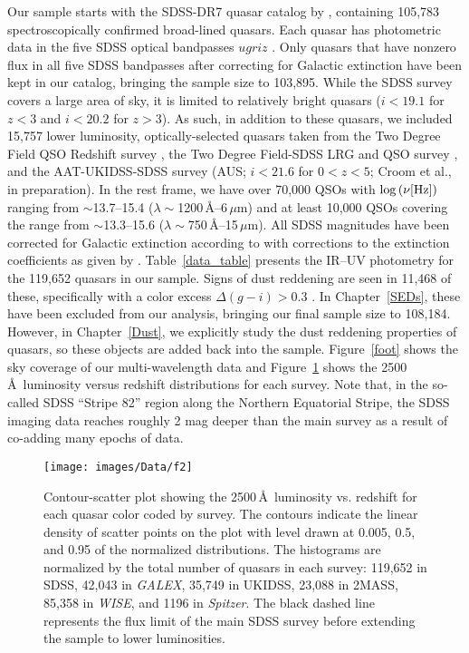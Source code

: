 Our sample starts with the SDSS-DR7 quasar catalog by \citet{Schneider:2010}, containing 105,783 spectroscopically confirmed broad-lined quasars.  Each quasar has photometric data in the five SDSS optical bandpasses $ugriz$ \citep{Fukugita:1996}.  
Only quasars that have nonzero flux in all five SDSS bandpasses after correcting for Galactic extinction have been kept in our catalog, bringing the sample size to 103,895.
While the SDSS survey covers a large area of sky, it is limited to relatively bright quasars ($i<19.1$ for $z<3$ and $i<20.2$ for $z>3$).  As such, in addition to these quasars, we included 15,757 lower luminosity, optically-selected quasars taken from the Two Degree Field QSO Redshift survey \citep[2QZ; $b_J<20.85$ for $z<3$;][]{Croom:2004}, the Two Degree Field-SDSS LRG and QSO survey \citep[2SLAQ; $g<21.85$ for $z<3$;][]{Croom:2009}, and the AAT-UKIDSS-SDSS survey (AUS; $i<21.6$ for $0<z<5$; Croom et al., in preparation). 
In the rest frame, we have over 70,000 QSOs with $\log{(\nu [{\rm Hz}])}$ ranging from $\sim$13.7--15.4 ($\lambda\sim$1200\,\AA--6\,$\mu$m) and at least 10,000 QSOs covering the range from $\sim$13.3--15.6 ($\lambda\sim$750\,\AA--15\,$\mu$m).
All SDSS magnitudes have been corrected for Galactic extinction according to \citet{Schlegel:1998} with corrections to the extinction coefficients as given by \citet{Schlafly:2011}. 
 Table~\ref{data_table} presents the IR--UV photometry for the 119,652 quasars in our sample.  
 Signs of dust reddening are seen in 11,468 of these, specifically with a color excess $\Delta(g-i) > 0.3$ \citep{Richards:2003}. 
 In Chapter~\ref{SEDs}, these have been excluded from our analysis, bringing our final sample size to 108,184. However, in Chapter~\ref{Dust}, we explicitly study the dust reddening properties of quasars, so these objects are added back into the sample.
 Figure~\ref{foot} shows the sky coverage of our multi-wavelength data and Figure~\ref{lum_v_z_survey} shows the 2500\,\AA\ luminosity versus redshift distributions for each survey.
Note that, in the so-called SDSS ``Stripe 82'' region \citep{Annis:2011} along the Northern Equatorial Stripe, the SDSS imaging data reaches roughly 2 mag deeper than the main survey as a result of co-adding many epochs of data.  

\begin{figure}[t]
\centering
\texttt{[image: images/Data/f2]}
\caption[Luminosity vs. redshift]{Contour-scatter plot showing the 2500\,\AA\ luminosity vs. redshift for each quasar color coded by survey. The contours indicate the linear density of scatter points on the plot with level drawn at 0.005, 0.5, and 0.95 of the normalized distributions.  The histograms are normalized by the total number of quasars in each survey:  119,652 in SDSS, 42,043 in {\em GALEX}, 35,749 in UKIDSS, 23,088 in 2MASS, 85,358 in {\em WISE}, and 1196 in {\em Spitzer}.  The black dashed line represents the flux limit of the main SDSS survey before extending the sample to lower luminosities.}
\label{lum_v_z_survey}
\end{figure}

